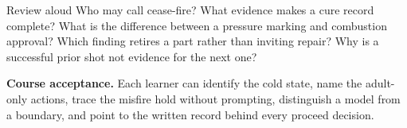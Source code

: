 \begin{telospanel}{Review aloud}
Who may call cease-fire? What evidence makes a cure record complete? What is
the difference between a pressure marking and combustion approval? Which
finding retires a part rather than inviting repair? Why is a successful prior
shot not evidence for the next one?
\end{telospanel}

\begin{telosframe}
\textbf{Course acceptance.} Each learner can identify the cold state, name the
adult-only actions, trace the misfire hold without prompting, distinguish a
model from a boundary, and point to the written record behind every proceed
decision.
\end{telosframe}

